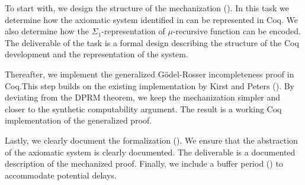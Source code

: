 \documentclass[a4paper]{scrartcl}
\begin{document}
To start with, we design the structure of the mechanization (). In this task we determine how the axiomatic system identified in  can be represented in Coq. We also determine how the $\Sigma_1$-representation of $\mu$-recursive function can be encoded. The deliverable of the task is a formal design describing the structure of the Coq development and the representation of the system.

Thereafter, we implement the generalized Gödel-Rosser incompleteness proof in Coq.This step builds on the existing implementation by Kirst and Peters (). By deviating from the DPRM theorem, we keep the mechanization simpler and closer to the synthetic computability argument. The result is a working Coq implementation of the generalized proof.

Lastly, we clearly document the formalization (). We ensure that the abstraction of the axiomatic system is clearly documented. The deliverable is a documented description of the mechanized proof. Finally, we include a buffer period () to accommodate potential delays.
\end{document}
